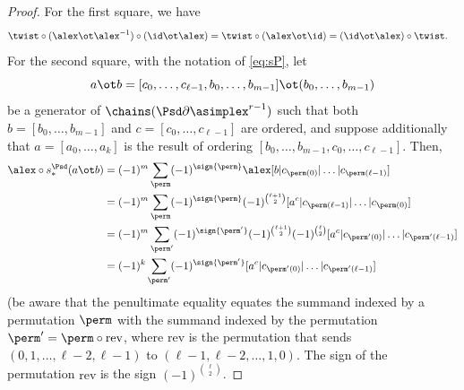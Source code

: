 \begin{proof}
	For the first square, we have
	\begin{align*}
		\twist\circ(\alex \ot \alex^{-1})\circ (\id\ot \alex)
		&=  \twist\circ(\alex \ot \id)
		=  (\id\ot \alex) \circ \twist.
	\end{align*}
	For the second square, with the notation of \eqref{eq:sP}, let
	$$a\ot b =  [c_0,\dots,c_{\ell-1},b_0,\dots,b_{m-1}]\ot(b_0,\dots,b_{m-1})$$ 
	be a generator of $\chains(\Psd \partial\asimplex^{r-1})$ such that both $b=[b_0,\dots,b_{m-1}]$ and $c=[c_0,\dots,c_{\ell-1}]$ are ordered, and suppose additionally that $a = [a_0,\dots,a_k]$ is the result of ordering $[b_0,\dots,b_{m-1},c_0,\dots,c_{\ell-1}]$. Then,
	\begin{equation}\label{eq:lastsign}
		\begin{split}
			\alex\circ s_*^{\Psd} (a \ot b)                                                        
			&= (-1)^{m}\sum_{\perm} (-1)^{\sign{\perm}} \alex[b|c_{\perm(0)}|\dots|c_{\perm(\ell-1)}]
			\\
			&= (-1)^{m} \sum_{\perm} (-1)^{\sign{\perm}} (-1)^{\binom{\ell+1}{2}} [a^c|c_{\perm(\ell-1)}|\dots|c_{\perm(0)}]
			\\
			&= (-1)^{m}\sum_{\perm'} (-1)^{\sign{\perm'}} (-1)^{\binom{\ell+1}{2}} (-1)^{\binom{\ell}{2}} [a^c|c_{\perm'(0)}|\dots|c_{\perm'(\ell-1)}]
			\\
			&= (-1)^{k}\sum_{\perm'} (-1)^{\sign{\perm'}} [a^c|c_{\perm'(0)}|\dots|c_{\perm'(\ell-1)}]
		\end{split}
	\end{equation}
	(be aware that the penultimate equality equates the summand indexed by a permutation $\perm$ with the summand indexed by the permutation $\perm' = \perm\circ \mathrm{rev}$, where $\mathrm{rev}$ is the permutation that sends $(0,1,\dots,\ell-2,\ell-1)$ to $(\ell-1,\ell-2,\dots,1,0)$. The sign of the permutation $\mathrm{rev}$ is the sign $(-1)^{\binom{\ell}{2}}$.


\end{proof}
